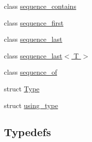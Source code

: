 \begin{DoxyCompactItemize}
class \hyperlink{classbc_1_1traits_1_1sequence__contains}{sequence\+\_\+contains}
\item 
class \hyperlink{classbc_1_1traits_1_1sequence__first}{sequence\+\_\+first}
\item 
class \hyperlink{classbc_1_1traits_1_1sequence__last}{sequence\+\_\+last}
\item 
class \hyperlink{classbc_1_1traits_1_1sequence__last_3_01T_01_4}{sequence\+\_\+last$<$ T $>$}
\item 
class \hyperlink{classbc_1_1traits_1_1sequence__of}{sequence\+\_\+of}
\item 
struct \hyperlink{structbc_1_1traits_1_1Type}{Type}
\item 
struct \hyperlink{structbc_1_1traits_1_1using__type}{using\+\_\+type}
\end{DoxyCompactItemize}
\subsection*{Typedefs}

